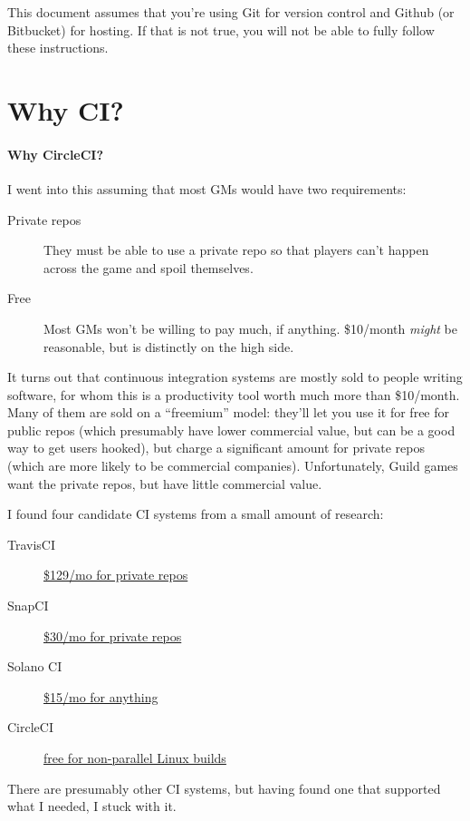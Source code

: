 \documentclass[green]{testgame}
\newenvironment{WrapText}[1][r]
  {\wrapfigure{#1}{0.5\textwidth}\tcolorbox}
  {\endtcolorbox\endwrapfigure}
\begin{document}
\newcommand{\ter}[1]{\fbox{\parbox{6.5in}{{\tt #1}}}}


This document assumes that you're using Git for version control and Github (or Bitbucket) for hosting. If that is not true, you will not be able to fully follow these instructions.

\section{Why CI?}
\label{sec:why}

\begin{WrapText}
  \paragraph*{Why CircleCI?} I went into this assuming that most GMs would have two requirements:
  \begin{description}
  \item[Private repos] They must be able to use a private repo so that players can't happen across the game and spoil themselves.
  \item[Free] Most GMs won't be willing to pay much, if anything. \$10/month \emph{might} be reasonable, but is distinctly on the high side.
  \end{description}

  It turns out that continuous integration systems are mostly sold to people writing software, for whom this is a productivity tool worth much more than \$10/month. Many of them are sold on a ``freemium'' model: they'll let you use it for free for public repos (which presumably have lower commercial value, but can be a good way to get users hooked), but charge a significant amount for private repos (which are more likely to be commercial companies). Unfortunately, Guild games want the private repos, but have little commercial value.

  I found four candidate CI systems from a small amount of research:
  \begin{description}
  \item[TravisCI] \href{https://travis-ci.com/plans}{\$129/mo for private repos}
  \item[SnapCI] \href{https://snap-ci.com/my_plans/}{\$30/mo for private repos}
  \item[Solano CI] \href{https://www.solanolabs.com/#pricing}{\$15/mo for anything}
  \item[CircleCI] \href{https://circleci.com/pricing/}{free for non-parallel Linux builds}
  \end{description}

  There are presumably other CI systems, but having found one that supported what I needed, I stuck with it.
\end{WrapText}
\end{document}

